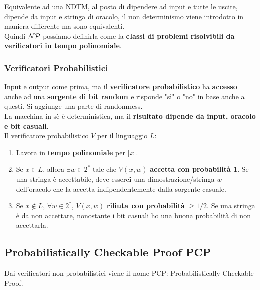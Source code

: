 Equivalente ad una NDTM, al posto di dipendere ad input e tutte le uscite, dipende da input e stringa di oracolo, il non determinismo viene introdotto in maniera differente ma sono equivalenti.\\

Quindi $\mathcal{NP}$ possiamo definirla come la \textbf{classi di problemi risolvibili da verificatori in tempo polinomiale}.

\newpage

\subsubsection{Verificatori Probabilistici}

Input e output come prima, ma il \textbf{verificatore probabilistico} ha \textbf{accesso} anche ad una \textbf{sorgente di bit random} e risponde "sì" o "no" in base anche a questi. Si aggiunge una parte di randomness.\\

La macchina in sè è deterministica, ma il \textbf{risultato dipende da input, oracolo e bit casuali}.\\

Il verificatore probabilistico $V$ per il linguaggio $L$: 
\begin{enumerate}
	\item Lavora in \textbf{tempo polinomiale} per $|x|$.\\
	
	\item Se $x \in L$, allora $\exists w \in 2^\ast$ tale che $V(x,w)$ \textbf{accetta con probabilità 1}. Se una stringa è accettabile, deve esserci una dimostrazione/stringa $w$ dell'oracolo che la accetta indipendentemente dalla sorgente casuale.\\
	
	\item Se $x \notin L$, $\forall w \in 2^\ast$, $V(x,w)$ \textbf{rifiuta con probabilità} $\geq 1/2$. Se una stringa è da non accettare, nonostante i bit casuali ho una buona probabilità di non accettarla.\\
\end{enumerate}

\newpage

\subsection{Probabilistically Checkable Proof PCP}

Dai verificatori non probabilistici viene il nome PCP: Probabilistically Checkable Proof.\\

